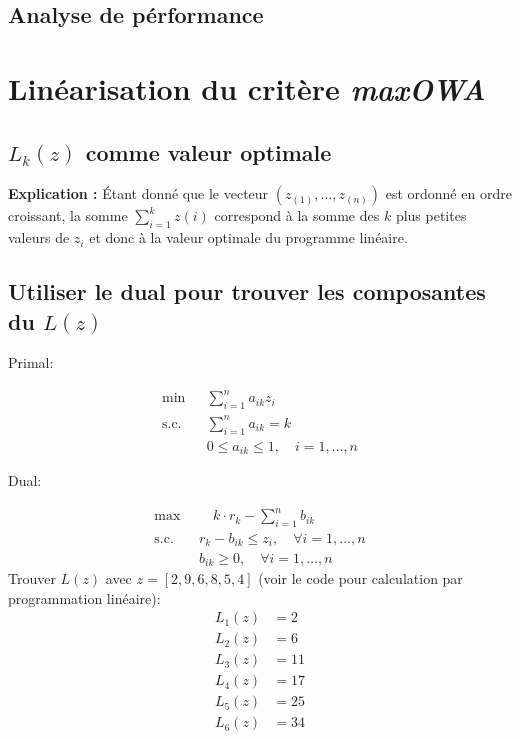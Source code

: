 \documentclass[10pt,a4paper]{report}
\begin{document}
\section{Analyse de pérformance}
\chapter{Linéarisation du critère \textit{maxOWA}}
\section{$L_k(z)$ comme valeur optimale}
\textbf{Explication :} Étant donné que le vecteur $(z_{(1)}, \ldots, z_{(n)})$ est ordonné en ordre croissant, la somme $\sum_{i=1}^{k} z(i)$ correspond à la somme des $k$ plus petites valeurs de $z_i$ et donc à la valeur optimale du programme linéaire.
\section{Utiliser le dual pour trouver les composantes du $L(z)$ }
Primal:

\begin{align*}
\min & \sum_{i=1}^{n} a_{ik} z_i \\
\text{s.c.} \quad & \sum_{i=1}^{n} a_{ik} = k \\
& 0 \leq a_{ik} \leq 1, \quad i = 1, \dots, n
\end{align*}

Dual:

\begin{align*}
\max & \quad k \cdot r_k - \sum_{i=1}^{n} b_{ik} \\
\text{s.c.} \quad & r_k - b_{ik} \leq z_i, \quad \forall i = 1, \dots, n \\
& b_{ik} \geq 0, \quad \forall i = 1, \dots, n
\end{align*}
Trouver $L(z)$ avec $z=[2,9,6,8,5,4]$ (voir le code pour calculation par programmation linéaire):
\begin{align*}
L_1(z)&= 2\\
L_2(z)&= 6\\
L_3(z)&= 11\\
L_4(z)&= 17\\
L_5(z)&= 25\\
L_6(z)&= 34\\
\end{align*}
\end{document}
